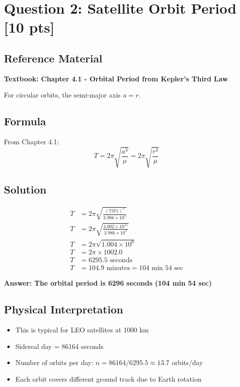 \documentclass[11pt,letterpaper]{article}
\begin{document}
\section{Question 2: Satellite Orbit Period [10 pts]}

\subsection{Reference Material}
\textbf{Textbook: Chapter 4.1 - Orbital Period from Kepler's Third Law}

For circular orbits, the semi-major axis $a = r$.

\subsection{Formula}
From Chapter 4.1:
\begin{equation}
T = 2\pi \sqrt{\frac{a^3}{\mu}} = 2\pi \sqrt{\frac{r^3}{\mu}}
\end{equation}

\subsection{Solution}
\begin{align}
T &= 2\pi \sqrt{\frac{(7371)^3}{3.986 \times 10^5}} \\
T &= 2\pi \sqrt{\frac{4.002 \times 10^{11}}{3.986 \times 10^5}} \\
T &= 2\pi \sqrt{1.004 \times 10^6} \\
T &= 2\pi \times 1002.0 \\
T &= 6295.5 \text{ seconds} \\
T &= 104.9 \text{ minutes} = 104 \text{ min } 54 \text{ sec}
\end{align}

\textbf{Answer: The orbital period is 6296 seconds (104 min 54 sec)}

\subsection{Physical Interpretation}
\begin{itemize}
    \item This is typical for LEO satellites at 1000 km
    \item Sidereal day = 86164 seconds
    \item Number of orbits per day: $n = 86164 / 6295.5 \approx 13.7$ orbits/day
    \item Each orbit covers different ground track due to Earth rotation
\end{itemize}
\end{document}
